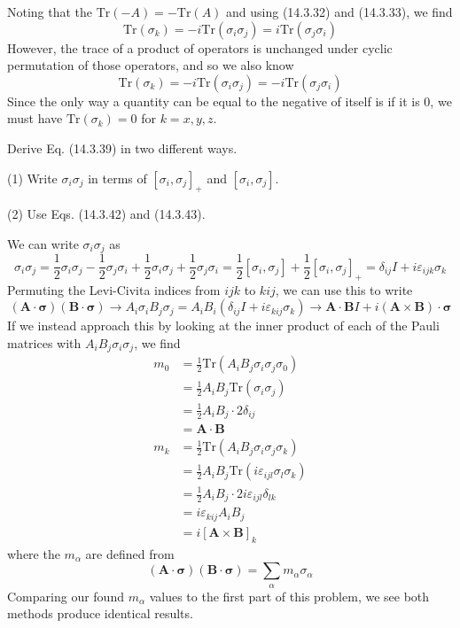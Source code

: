 \documentclass[../principles-of-quantum-mechanics.tex]{subfiles}
\begin{document}
\begin{questions}
		\begin{solution}
			Noting that the $\mathrm{Tr}(-A) = -\mathrm{Tr}(A)$ and using (14.3.32) and (14.3.33), we find
			$$\mathrm{Tr}(\sigma_k) = -i\mathrm{Tr}(\sigma_i\sigma_j) = i\mathrm{Tr}(\sigma_j\sigma_i)$$
			However, the trace of a product of operators is unchanged under cyclic permutation of those operators, and so we also know
			$$\mathrm{Tr}(\sigma_k) = -i\mathrm{Tr}(\sigma_i\sigma_j) = -i\mathrm{Tr}(\sigma_j\sigma_i)$$
			Since the only way a quantity can be equal to the negative of itself is if it is 0, we must have $\mathrm{Tr}(\sigma_k) = 0$ for $k = x, y, z$.
		\end{solution}
		
		\question Derive Eq. (14.3.39) in two different ways.
		
		(1) Write $\sigma_i\sigma_j$ in terms of $[\sigma_i, \sigma_j]_+$ and $[\sigma_i, \sigma_j]$.
		
		(2) Use Eqs. (14.3.42) and (14.3.43).
		
		\begin{solution}
			We can write $\sigma_i\sigma_j$ as
			$$\sigma_i\sigma_j = \frac{1}{2}\sigma_i\sigma_j - \frac{1}{2}\sigma_j\sigma_i + \frac{1}{2}\sigma_i\sigma_j + \frac{1}{2}\sigma_j\sigma_i = \frac{1}{2}[\sigma_i, \sigma_j] + \frac{1}{2}[\sigma_i, \sigma_j]_+ = \delta_{ij}I + i\varepsilon_{ijk}\sigma_k$$
			Permuting the Levi-Civita indices from $ijk$ to $kij$, we can use this to write
			$$(\mathbf{A}\cdot\boldsymbol{\sigma})(\mathbf{B}\cdot\boldsymbol{\sigma}) \to A_i\sigma_iB_j\sigma_j = A_iB_i(\delta_{ij}I + i\varepsilon_{kij}\sigma_k) \to \mathbf{A}\cdot\mathbf{B}I + i(\mathbf{A}\times\mathbf{B})\cdot\boldsymbol{\sigma}$$
			If we instead approach this by looking at the inner product of each of the Pauli matrices with $A_iB_j\sigma_i\sigma_j$, we find
			\begin{align*}
				m_0 &= \frac{1}{2}\mathrm{Tr}(A_iB_j\sigma_i\sigma_j\sigma_0) \\
				&= \frac{1}{2}A_iB_j\mathrm{Tr}(\sigma_i\sigma_j) \\
				&= \frac{1}{2}A_iB_j\cdot2\delta_{ij} \\
				&= \mathbf{A}\cdot\mathbf{B} \\
				m_k &= \frac{1}{2}\mathrm{Tr}(A_iB_j\sigma_i\sigma_j\sigma_k) \\
				&= \frac{1}{2}A_iB_j\mathrm{Tr}(i\varepsilon_{ijl}\sigma_l\sigma_k) \\
				&= \frac{1}{2}A_iB_j\cdot 2i\varepsilon_{ijl}\delta_{lk} \\
				&= i\varepsilon_{kij}A_iB_j \\
				&= i[\mathbf{A}\times\mathbf{B}]_k
			\end{align*}
			where the $m_\alpha$ are defined from
			$$(\mathbf{A}\cdot\boldsymbol{\sigma})(\mathbf{B}\cdot\boldsymbol{\sigma}) = \sum_\alpha m_\alpha \sigma_\alpha$$
			Comparing our found $m_\alpha$ values to the first part of this problem, we see both methods produce identical results.
		\end{solution}
		

\end{questions}
\end{document}
